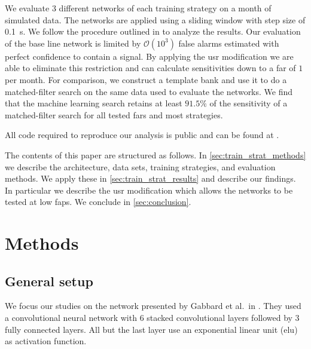 We evaluate 3 different networks of each training strategy on a month of simulated data. The networks are applied using a sliding window with step size of \SI{0.1}{\second}. We follow the procedure outlined in \cite{Schafer:2020kor} to analyze the results. Our evaluation of the base line network is limited by $\mathcal{O}\left(10^3\right)$ false alarms estimated with perfect confidence to contain a signal. By applying the \acrshort{usr} modification we are able to eliminate this restriction and can calculate sensitivities down to a \acrshort{far} of $1$ per month. For comparison, we construct a template bank and use it to do a matched-filter search on the same data used to evaluate the networks. We find that the machine learning search retains at least $91.5\%$ of the sensitivity of a matched-filter search for all tested \acrshort{far}s and most strategies.

All code required to reproduce our analysis is public and can be found at \cite{ml-training-strategies-github}.

The contents of this paper are structured as follows. In \autoref{sec:train_strat_methods} we describe the architecture, data sets, training strategies, and evaluation methods. We apply these in \autoref{sec:train_strat_results} and describe our findings. In particular we describe the \acrshort{usr} modification which allows the networks to be tested at low \acrshort{fap}s. We conclude in \autoref{sec:conclusion}.


\section{Methods}\label{sec:train_strat_methods}

\subsection{General setup}\label{sec:methods:general}
We focus our studies on the network presented by Gabbard et al.\ in \cite{Gabbard:2017lja}. They used a convolutional neural network with 6 stacked convolutional layers followed by 3 fully connected layers. All but the last layer use an exponential linear unit (\acrshort{elu}) as activation function.

